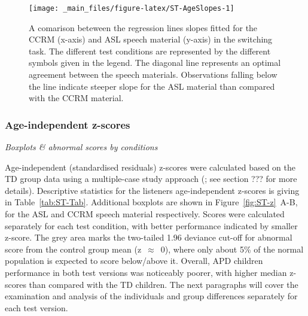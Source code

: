 \documentclass[a4paper, twoside]{templates/ociamthesis}
\begin{document}
\begin{figure}

{\centering \texttt{[image: \_main\_files/figure-latex/ST-AgeSlopes-1]} 

}

\caption{A comarison beteween the regression lines slopes fitted for the CCRM (x-axis) and ASL speech material (y-axis) in the switching task. The different test conditions are represented by the different symbols given in the legend. The diagonal line represents an optimal agreement between the speech materials. Observations falling below the line indicate steeper slope for the ASL material than compared with the CCRM material.}\label{fig:ST-AgeSlopes}
\end{figure}

\hypertarget{age-independent-z-scores}{%
\subsubsection*{Age-independent z-scores}\label{age-independent-z-scores}}

\colorbox[HTML]{CCCCFF}{\emph{Boxplots \& abnormal scores by conditions}}

Age-independent (standardised residuals) z-scores were calculated based on the TD group data using a multiple-case study approach (\textcite{Ramus2003}; see section ??? for more details). Descriptive statistics for the listeners age-independent z-scores is giving in Table~\ref{tab:ST-Tab}. Additional boxplots are shown in Figure~\ref{fig:ST-z}~A-B, for the ASL and CCRM speech material respectively. Scores were calculated separately for each test condition, with better performance indicated by smaller z-score. The grey area marks the two-tailed 1.96 deviance cut-off for abnormal score from the control group mean (z~\(\approx\)~0), where only about 5\% of the normal population is expected to score below/above it. Overall, APD children performance in both test versions was noticeably poorer, with higher median z-scores than compared with the TD children. The next paragraphs will cover the examination and analysis of the individuals and group differences separately for each test version.
\end{document}
